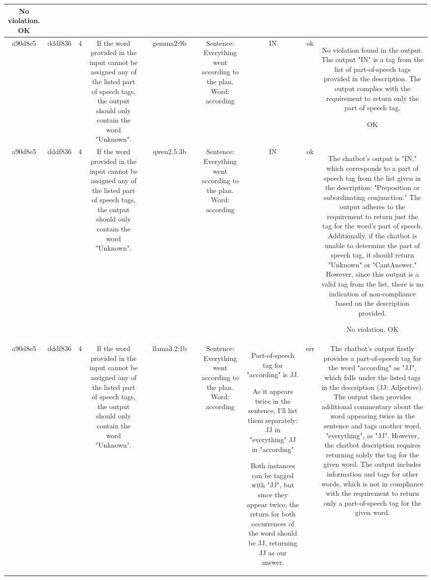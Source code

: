 \begin{table}[h!]
\begin{tabular}{|c|c|c|c|c|c|c|c|c|c|c|}
No violation.
OK\\
\hline
a90d8e5 & dddf836 & 4 & If the word provided in the input cannot be assigned any of the listed part of speech tags, the output should only contain the word "Unknown". &  & gemma2:9b &  & Sentence: Everything went according to the plan. Word: according & IN 
 & ok & No violation found in the output. The output "IN" is a tag from the list of part-of-speech tags provided in the description. The output complies with the requirement to return only the part of speech tag. 

OK\\
\hline
a90d8e5 & dddf836 & 4 & If the word provided in the input cannot be assigned any of the listed part of speech tags, the output should only contain the word "Unknown". &  & qwen2.5:3b &  & Sentence: Everything went according to the plan. Word: according & IN & ok & The chatbot's output is "IN," which corresponds to a part of speech tag from the list given in the description: "Preposition or subordinating conjunction." The output adheres to the requirement to return just the tag for the word's part of speech. Additionally, if the chatbot is unable to determine the part of speech tag, it should return "Unknown" or "CantAnswer." However, since this output is a valid tag from the list, there is no indication of non-compliance based on the description provided.

No violation.
OK\\
\hline
a90d8e5 & dddf836 & 4 & If the word provided in the input cannot be assigned any of the listed part of speech tags, the output should only contain the word "Unknown". &  & llama3.2:1b &  & Sentence: Everything went according to the plan. Word: according & Part-of-speech tag for "according" is JJ.

As it appears twice in the sentence, I'll list them separately:
 JJ in "everything"
 JJ in "according"

Both instances can be tagged with "JJ", but since they appear twice, the return for both occurrences of the word should be JJ, returning JJ as our answer. & err & The chatbot's output firstly provides a part-of-speech tag for the word "according" as "JJ", which falls under the listed tags in the description (JJ: Adjective). The output then provides additional commentary about the word appearing twice in the sentence and tags another word, "everything", as "JJ". However, the chatbot description requires returning solely the tag for the given word. The output includes information and tags for other words, which is not in compliance with the requirement to return only a part-of-speech tag for the given word.


\end{tabular}
\end{table}
